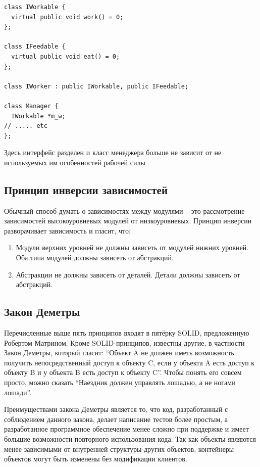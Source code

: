 \documentclass[a4paper,12pt,oneside]{book}
\begin{document}
\begin{lstlisting}
class IWorkable {
  virtual public void work() = 0;
};

class IFeedable {
  virtual public void eat() = 0;
};

class IWorker : public IWorkable, public IFeedable;

class Manager {
  IWorkable *m_w;
// ..... etc
};
\end{lstlisting}

Здесь интерфейс разделен и класс менеджера больше не зависит от не используемых им особенностей рабочей силы

\subsection{Принцип инверсии зависимостей}\label{DIP}

Обычный способ думать о зависимостях между модулями -- это рассмотрение зависимостей высокоуровневых модулей от низкоуровневых. Принцип инверсии разворачивает зависимость и гласит, что:

\begin{enumerate}
\item Модули верхних уровней не должны зависеть от модулей нижних уровней. Оба типа модулей должны зависеть от абстракций.
\item Абстракции не должны зависеть от деталей. Детали должны зависеть от абстракций.
\end{enumerate}

\subsection{Закон Деметры}\label{DemeterLaw}

Перечисленные выше пять принципов входят в пятёрку SOLID, предложенную Робертом Матрином. Кроме SOLID-принципов, известны другие, в частности Закон Деметры, который гласит: ``Объект A не должен иметь возможность получить непосредственный доступ к объекту C, если у объекта A есть доступ к объекту B и у объекта B есть доступ к объекту C''. Чтобы понять его совсем просто, можно сказать ``Наездник должен управлять лошадью, а не ногами лошади''.

Преимуществами закона Деметры является то, что код, разработанный с соблюдением данного закона, делает написание тестов более простым, а разработанное программное обеспечение менее сложно при поддержке и имеет большие возможности повторного использования кода. Так как объекты являются менее зависимыми от внутренней структуры других объектов, контейнеры объектов могут быть изменены без модификации клиентов.
\end{document}
